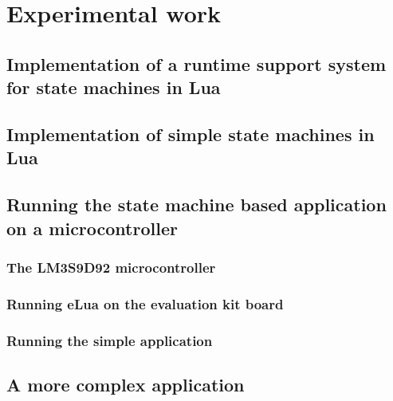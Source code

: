 \chapter{Experimental work}
\label{ch:experimental_work}

\section{Implementation of a runtime support system for state machines in Lua}
\label{sec:impl_runtime_support}

\section{Implementation of simple state machines in Lua}
\label{sec:impl_state_machines}

\section{Running the state machine based application on a microcontroller}
\label{sec:running_on_micro}

\subsection{The LM3S9D92 microcontroller}

\subsection{Running eLua on the evaluation kit board}

\subsection{Running the simple application}

\section{A more complex application}
\label{sec:impl_complex_app}
